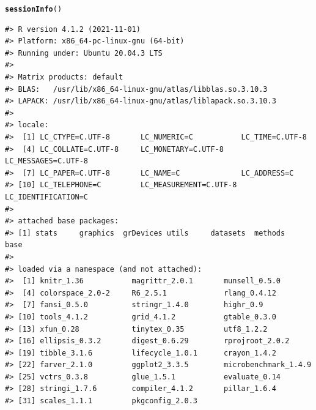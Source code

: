 \documentclass{article}\usepackage[]{graphicx}\usepackage{xcolor}
\makeatletter
\newcommand{\hlstd}[1]{\textcolor[rgb]{0.345,0.345,0.345}{#1}}%
\newcommand{\hlkwd}[1]{\textcolor[rgb]{0.737,0.353,0.396}{\textbf{#1}}}%
\newenvironment{kframe}{%
 \def\at@end@of@kframe{}%
 \ifinner\ifhmode%
  \def\at@end@of@kframe{\end{minipage}}%
  \begin{minipage}{\columnwidth}%
 \fi\fi%
 \def\FrameCommand##1{\hskip\@totalleftmargin \hskip-\fboxsep
 \colorbox{shadecolor}{##1}\hskip-\fboxsep
     \hskip-\linewidth \hskip-\@totalleftmargin \hskip\columnwidth}%
 \MakeFramed {\advance\hsize-\width
   \@totalleftmargin\z@ \linewidth\hsize
   \@setminipage}}%
 {\par\unskip\endMakeFramed%
 \at@end@of@kframe}
\newenvironment{knitrout}{}{} %
\makeatother
\begin{document}
\begin{knitrout}
\color{fgcolor}\begin{kframe}
\begin{alltt}
\hlkwd{sessionInfo}\hlstd{()}
\end{alltt}
\begin{verbatim}
#> R version 4.1.2 (2021-11-01)
#> Platform: x86_64-pc-linux-gnu (64-bit)
#> Running under: Ubuntu 20.04.3 LTS
#> 
#> Matrix products: default
#> BLAS:   /usr/lib/x86_64-linux-gnu/atlas/libblas.so.3.10.3
#> LAPACK: /usr/lib/x86_64-linux-gnu/atlas/liblapack.so.3.10.3
#> 
#> locale:
#>  [1] LC_CTYPE=C.UTF-8       LC_NUMERIC=C           LC_TIME=C.UTF-8       
#>  [4] LC_COLLATE=C.UTF-8     LC_MONETARY=C.UTF-8    LC_MESSAGES=C.UTF-8   
#>  [7] LC_PAPER=C.UTF-8       LC_NAME=C              LC_ADDRESS=C          
#> [10] LC_TELEPHONE=C         LC_MEASUREMENT=C.UTF-8 LC_IDENTIFICATION=C   
#> 
#> attached base packages:
#> [1] stats     graphics  grDevices utils     datasets  methods   base     
#> 
#> loaded via a namespace (and not attached):
#>  [1] knitr_1.36           magrittr_2.0.1       munsell_0.5.0       
#>  [4] colorspace_2.0-2     R6_2.5.1             rlang_0.4.12        
#>  [7] fansi_0.5.0          stringr_1.4.0        highr_0.9           
#> [10] tools_4.1.2          grid_4.1.2           gtable_0.3.0        
#> [13] xfun_0.28            tinytex_0.35         utf8_1.2.2          
#> [16] ellipsis_0.3.2       digest_0.6.29        rprojroot_2.0.2     
#> [19] tibble_3.1.6         lifecycle_1.0.1      crayon_1.4.2        
#> [22] farver_2.1.0         ggplot2_3.3.5        microbenchmark_1.4.9
#> [25] vctrs_0.3.8          glue_1.5.1           evaluate_0.14       
#> [28] stringi_1.7.6        compiler_4.1.2       pillar_1.6.4        
#> [31] scales_1.1.1         pkgconfig_2.0.3
\end{verbatim}
\end{kframe}
\end{knitrout}

\nocite{R-2021}

\printbibliography
\end{document}
